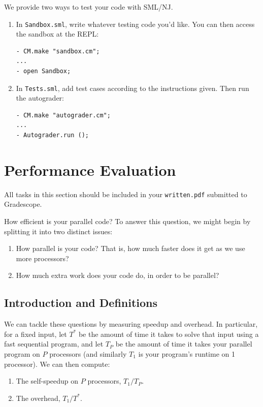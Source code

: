 \begin{gram}
We provide two ways to test your code with SML/NJ.
\begin{enumerate}
  \item
  In \texttt{Sandbox.sml}, write whatever testing code you'd like. You can then
  access the sandbox at the REPL:
\begin{verbatim}
- CM.make "sandbox.cm";
...
- open Sandbox;
\end{verbatim}

  \item
  In \texttt{Tests.sml}, add test cases according to the instructions given.
  Then run the autograder:
\begin{verbatim}
- CM.make "autograder.cm";
...
- Autograder.run ();
\end{verbatim}
\end{enumerate}
\end{gram}

\section{Performance Evaluation}
\begin{note}
All tasks in this section should be included in your \texttt{written.pdf}
submitted to Gradescope.
\end{note}

\begin{gram}
How efficient is your parallel code? To answer this question, we might begin by
splitting it into two distinct issues:

\begin{enumerate}
\item How parallel is your code? That is, how much faster does it get as we use more processors?
\item How much extra work does your code do, in order to be parallel?
\end{enumerate}
\end{gram}

\subsection{Introduction and Definitions}
\label{subsub:defns}
\begin{gram}
We can tackle these questions by measuring speedup and overhead. In particular,
for a fixed input, let $T^*$ be the amount of time it takes to solve that
input using a fast sequential program, and let $T_P$ be the amount of time it
takes your parallel program on $P$ processors (and similarly $T_1$ is your program's
runtime on 1 processor). We can then compute:

\begin{enumerate}
\item The self-speedup on $P$ processors, $T_1 / T_P$.
\item The overhead, $T_1 / T^*$.
\end{enumerate}
\end{gram}

